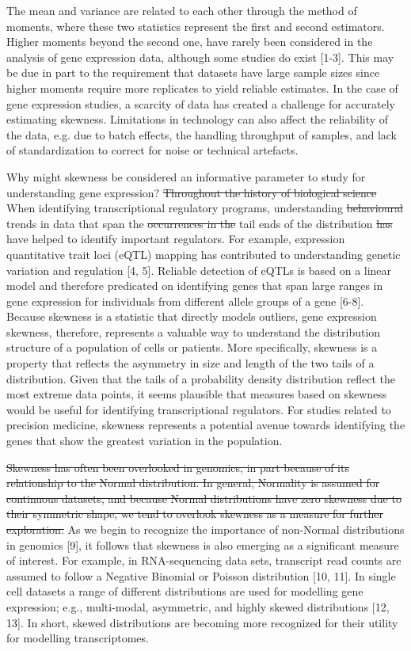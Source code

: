 \documentclass[11pt]{article}
\newcommand{\sr}[1]{{\color{red} \st{#1} }}
\newcommand{\rd}[1]{{\color{red}#1}}
\begin{document}
The mean and variance are related to each other through the method of moments, where these two statistics represent the first and second estimators. Higher moments beyond the second one, have rarely been considered in the analysis of gene expression data, although some studies do exist [1-3]. This may be due in part to the requirement that datasets have large sample sizes since higher moments require more replicates to yield reliable estimates. In the case of gene expression studies, a scarcity of data has created a challenge for accurately estimating skewness. Limitations in technology can also affect the reliability of the data, e.g. due to batch effects, the handling throughput of samples, and lack of standardization to correct for noise or technical artefacts.
\newline

Why might skewness be considered an informative parameter to study for understanding gene expression? \sr{Throughout the history of biological science}\rd{When identifying transcriptional regulatory programs}, understanding \sr{behavioural} \rd{trends in data that span the} \sr{occurrences in the} tail ends of the distribution \sr{has} \rd{have} helped to identify important regulators. \rd{For example, expression quantitative trait loci (eQTL) mapping has contributed to understanding genetic variation and regulation [4, 5]. Reliable detection of eQTLs is based on a linear model and therefore predicated on identifying genes that span large ranges in gene expression for individuals from different allele groups of a gene [6-8].} Because skewness is a statistic that directly models outliers, gene expression skewness, therefore, represents a valuable way to understand the distribution structure of a population of cells or patients. More specifically, skewness is a property that reflects the asymmetry in size and length of the two tails of a distribution. Given that the tails of a probability density distribution reflect the most extreme data points, it seems plausible that measures based on skewness would be useful for identifying transcriptional regulators. For studies related to precision medicine, skewness represents a potential avenue towards identifying the genes that show the greatest variation in the population.
\newline

\sr{Skewness has often been overlooked in genomics, in part because of its relationship to the Normal distribution. In general, Normality is assumed for continuous datasets, and because Normal distributions have zero skewness due to their symmetric shape, we tend to overlook skewness as a measure for further exploration.} As we begin to recognize the importance of non-Normal distributions in genomics [9], it follows that skewness is also emerging as a significant measure of interest. For example, in RNA-sequencing data sets, transcript read counts are assumed to follow a Negative Binomial or Poisson distribution [10, 11]. In single cell datasets a range of different distributions are used for modelling gene expression; e.g., multi-modal, asymmetric, and highly skewed distributions [12, 13]. In short, skewed distributions are becoming more recognized for their utility for modelling transcriptomes. 
\newline
\end{document}
